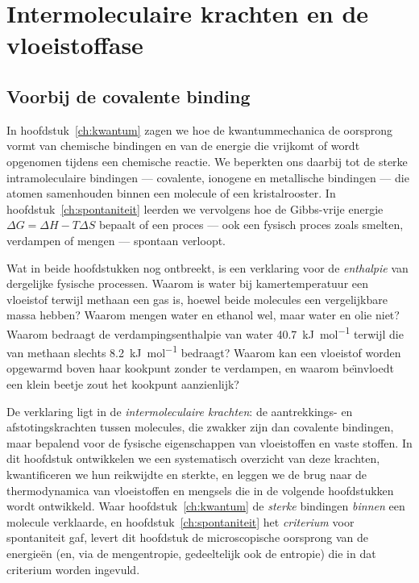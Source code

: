 \chapter{Intermoleculaire krachten en de vloeistoffase}
\label{ch:intermoleculair}

\section{Voorbij de covalente binding}
\label{sec:voorbij-covalent}

In hoofdstuk~\ref{ch:kwantum} zagen we hoe de kwantummechanica de oorsprong vormt van chemische bindingen en van de energie die vrijkomt of wordt opgenomen tijdens een chemische reactie. We beperkten ons daarbij tot de sterke intramoleculaire bindingen --- covalente, ionogene en metallische bindingen --- die atomen samenhouden binnen een molecule of een kristalrooster. In hoofdstuk~\ref{ch:spontaniteit} leerden we vervolgens hoe de Gibbs-vrije energie $\Delta G=\Delta H-T\Delta S$ bepaalt of een proces --- ook een fysisch proces zoals smelten, verdampen of mengen --- spontaan verloopt.

Wat in beide hoofdstukken nog ontbreekt, is een verklaring voor de \emph{enthalpie} van dergelijke fysische processen. Waarom is water bij kamertemperatuur een vloeistof terwijl methaan een gas is, hoewel beide molecules een vergelijkbare massa hebben? Waarom mengen water en ethanol wel, maar water en olie niet? Waarom bedraagt de verdampingsenthalpie van water \SI{40.7}{\kilo\joule\per\mole} terwijl die van methaan slechts \SI{8.2}{\kilo\joule\per\mole} bedraagt? Waarom kan een vloeistof worden opgewarmd boven haar kookpunt zonder te verdampen, en waarom be\"\i nvloedt een klein beetje zout het kookpunt aanzienlijk?

De verklaring ligt in de \emph{intermoleculaire krachten}: de aantrekkings- en afstotingskrachten tussen molecules, die zwakker zijn dan covalente bindingen, maar bepalend voor de fysische eigenschappen van vloeistoffen en vaste stoffen. In dit hoofdstuk ontwikkelen we een systematisch overzicht van deze krachten, kwantificeren we hun reikwijdte en sterkte, en leggen we de brug naar de thermodynamica van vloeistoffen en mengsels die in de volgende hoofdstukken wordt ontwikkeld. Waar hoofdstuk~\ref{ch:kwantum} de \emph{sterke} bindingen \emph{binnen} een molecule verklaarde, en hoofdstuk~\ref{ch:spontaniteit} het \emph{criterium} voor spontaniteit gaf, levert dit hoofdstuk de microscopische oorsprong van de energie\"en (en, via de mengentropie, gedeeltelijk ook de entropie) die in dat criterium worden ingevuld.

